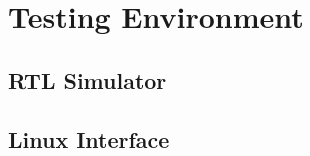 \section{Testing Environment}
\blindtext
\subsection{RTL Simulator}
\blindtext
\subsection{Linux Interface}
\blindtext